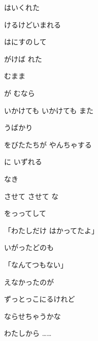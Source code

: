\documentclass[a4paper,tate,twocolumn,12pt]{ltjtarticle}
\begin{document}
\begin{flushleft}
\vspace{2em}

\noindent\begin{minipage}{\linewidth}
はいくれた

けるけどいまれる

はにすのして

がけば れた

 むまま

が むなら
\end{minipage}

\vspace{2em}

\noindent\begin{minipage}{\linewidth}
いかけても いかけても また

 うばかり

をびたたちが やんちゃする

に いずれる

なき

させて させて な
\end{minipage}

\vspace{2em}

\noindent\begin{minipage}{\linewidth}
をっってして

「わたしだけ はかってたよ」

いがったどのも

「なんてつもない」

えなかったのが

ずっとっこにるけれど

ならせちゃうかな

わたしから ……
\end{minipage}


\end{flushleft}
\end{document}

